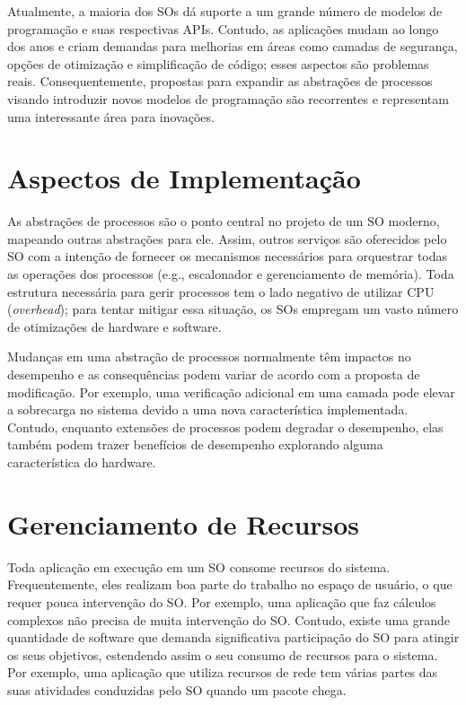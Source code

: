 Atualmente, a maioria dos SOs dá suporte a um grande número de modelos de
programação e suas respectivas APIs. Contudo, as aplicações mudam ao longo dos
anos e criam demandas para melhorias em áreas como camadas de segurança, opções
de otimização e simplificação de código; esses aspectos são problemas reais.
Consequentemente, propostas para expandir as abstrações de processos visando
introduzir novos modelos de programação são recorrentes e representam uma
interessante área para inovações.

\section{Aspectos de Implementação}

As abstrações de processos são o ponto central no projeto de um SO moderno,
mapeando outras abstrações para ele. Assim, outros serviços são oferecidos pelo
SO com a intenção de fornecer os mecanismos necessários para orquestrar todas
as operações dos processos (e.g., escalonador e gerenciamento de memória). Toda
estrutura necessária para gerir processos tem o lado negativo de utilizar CPU
(\emph{overhead}); para tentar mitigar essa situação, os SOs empregam um vasto
número de otimizações de hardware e software.

Mudanças em uma abstração de processos normalmente têm impactos no desempenho e
as consequências podem variar de acordo com a proposta de modificação. Por
exemplo, uma verificação adicional em uma camada pode elevar a sobrecarga no
sistema devido a uma nova característica implementada. Contudo, enquanto
extensões de processos podem degradar o desempenho, elas também podem trazer
benefícios de desempenho explorando alguma característica do hardware.

\section{Gerenciamento de Recursos}

Toda aplicação em execução em um SO consome recursos do sistema.
Frequentemente, eles realizam boa parte do trabalho no espaço de usuário, o que
requer pouca intervenção do SO. Por exemplo, uma aplicação que faz cálculos
complexos não precisa de muita intervenção do SO. Contudo, existe uma grande
quantidade de software que demanda significativa participação do SO para
atingir os seus objetivos, estendendo assim o seu consumo de recursos para o
sistema. Por exemplo, uma aplicação que utiliza recursos de rede tem várias
partes das suas atividades conduzidas pelo SO quando um pacote chega.

